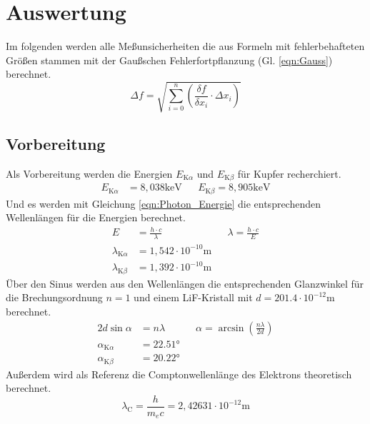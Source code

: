 \section{Auswertung}
\label{sec:Auswertung}

Im folgenden werden alle Meßunsicherheiten die aus Formeln mit fehlerbehafteten Größen stammen
mit der Gaußschen Fehlerfortpflanzung (Gl. \ref{eqn:Gauss}) berechnet.
\begin{equation}
    \Delta f =  \sqrt{\sum_{i=0}^n \left( \frac{\delta f}{\delta x_i} \cdot \Delta x_i\right)}   
    \label{eqn:Gauss}
\end{equation}

\subsection{Vorbereitung}
Als Vorbereitung werden die Energien $E_{\text{K}\alpha}$ und $E_{\text{K}\beta}$ für Kupfer recherchiert.
\begin{align}
    E_{\text{K}\alpha} &= 8,038\text{keV}    &&   E_{\text{K}\beta} = 8,905\text{keV} \label{eqn:EnergieKupfer}
\end{align}
Und es werden mit Gleichung \ref{eqn:Photon_Energie} die entsprechenden Wellenlängen für die Energien berechnet.
\begin{align}
    E &= \frac{h\cdot c}{\lambda} && \lambda = \frac{h\cdot c}{E} \nonumber \\
    \lambda_{\text{K}\alpha} &= 1,542\cdot 10^{-10} \text{m} \\
    \lambda_{\text{K}\beta} &= 1,392 \cdot 10^{-10} \text{m} 
\end{align}
Über den Sinus werden aus den Wellenlängen die entsprechenden Glanzwinkel für die Brechungsordnung $n=1$ und einem LiF-Kristall mit $d = 201.4\cdot10^{-12} \text{m}$ berechnet.
\begin{align}
   2d\sin{\alpha} &= n\lambda && \alpha = \arcsin \left(\frac{n\lambda}{2d}\right) \nonumber \\
   \alpha_{\text{K}\alpha} &= 22.51° \\
   \alpha_{\text{K}\beta} &= 20.22°
\end{align}
Außerdem wird als Referenz die Comptonwellenlänge des Elektrons theoretisch berechnet.
\begin{equation}
    \lambda_{\text{C}} = \frac{h}{m_e c} = 2,42631 \cdot 10^{-12} \text{m}
\end{equation}

